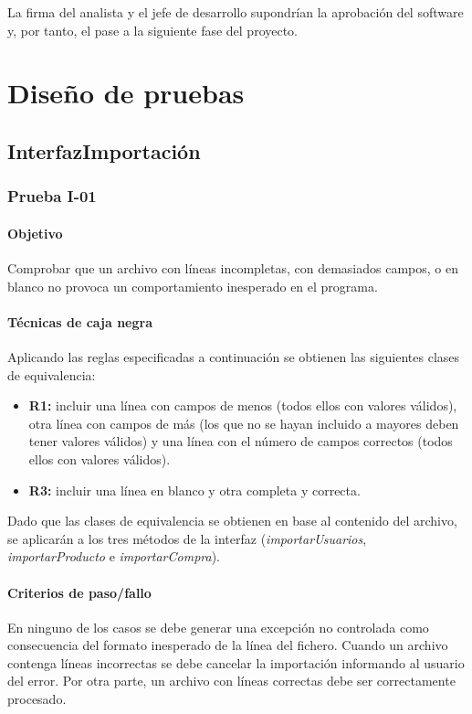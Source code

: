 \documentclass[10pt,a4paper]{article}
\begin{document}
		La firma del analista y el jefe de desarrollo supondrían la aprobación del software y, por tanto, el pase a la siguiente fase del proyecto.


\section{Diseño de pruebas}
	\subsection{InterfazImportación}
			\subsubsection{Prueba I-01}
			\paragraph{Objetivo} Comprobar que un archivo con líneas incompletas, con demasiados campos, o en blanco no provoca un comportamiento inesperado en el programa.
			\paragraph{Técnicas de caja negra} Aplicando las reglas especificadas a continuación se obtienen las siguientes clases de equivalencia:
			\begin{itemize}
				\item \textbf{R1:} incluir una línea con campos de menos (todos ellos con valores válidos), otra línea con campos de más (los que no se hayan incluido a mayores deben tener valores válidos) y una línea con el número de campos correctos (todos ellos con valores válidos).
				\item \textbf{R3:} incluir una línea en blanco y otra completa y correcta.
			\end{itemize}
			Dado que las clases de equivalencia se obtienen en base al contenido del archivo, se aplicarán a los tres métodos de la interfaz  (\textit{importarUsuarios}, \textit{importarProducto} e \textit{importarCompra}).
			\paragraph{Criterios de paso/fallo}
			En ninguno de los casos se debe generar una excepción no controlada como consecuencia del formato inesperado de la línea del fichero. Cuando un archivo contenga líneas incorrectas se debe cancelar la importación informando al usuario del error. Por otra parte, un archivo con líneas correctas debe ser correctamente procesado.
\end{document}
